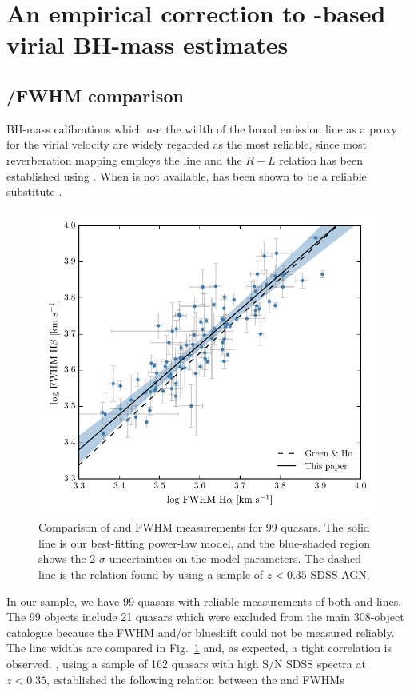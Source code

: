 \section{An empirical correction to -based virial BH-mass estimates}

\subsection{\hans/\hb FWHM comparison}
\label{sec:hahbcomparison}

BH-mass calibrations which use the width of the broad \hb emission line as a proxy for the virial velocity are widely regarded as the most reliable, since most reverberation mapping employs the \hb line and the $R-L$ relation has been established using \hbns.
When \hb is not available, \ha has been shown to be a reliable substitute \citep[e.g.][]{greene05b,shen11,shen12}. 

\begin{figure}
    \centering 
    \includegraphics[width=0.8\columnwidth]{figures/chapter03/ha_hb_width_comparison.pdf} 
    \caption[{Comparison of \ha and \hb FWHM measurements for 99 quasars.}]{Comparison of \ha and \hb FWHM measurements for 99 quasars. The solid line is our best-fitting power-law model, and the blue-shaded region shows the 2-$\sigma$ uncertainties on the model parameters. The dashed line is the relation found by \citet{greene05b} using a sample of $z<0.35$ SDSS AGN.} 
    \label{fig:hahbcomp}
\end{figure}

In our sample, we have 99 quasars with reliable measurements of both \ha and \hb lines. 
The 99 objects include 21 quasars which were excluded from the main 308-object catalogue because the  FWHM and/or blueshift could not be measured reliably. 
The line widths are compared in Fig.~\ref{fig:hahbcomp} and, as expected, a tight correlation is observed.  
\citet{greene05b}, using a sample of 162 quasars with high S/N SDSS spectra at $z < 0.35$, established the following relation between the \ha and \hb FWHMs

